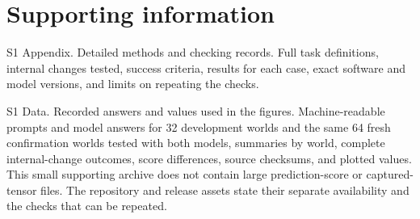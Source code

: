 \documentclass[10pt,letterpaper]{article}
\begin{document}
\section*{Supporting information}

S1 Appendix. Detailed methods and checking records. Full task definitions, internal changes tested, success criteria, results for each case, exact software and model versions, and limits on repeating the checks.


S1 Data. Recorded answers and values used in the figures. Machine-readable prompts and model answers for 32 development worlds and the same 64 fresh confirmation worlds tested with both models, summaries by world, complete internal-change outcomes, score differences, source checksums, and plotted values. This small supporting archive does not contain large prediction-score or captured-tensor files. The repository and release assets state their separate availability and the checks that can be repeated.
\end{document}

